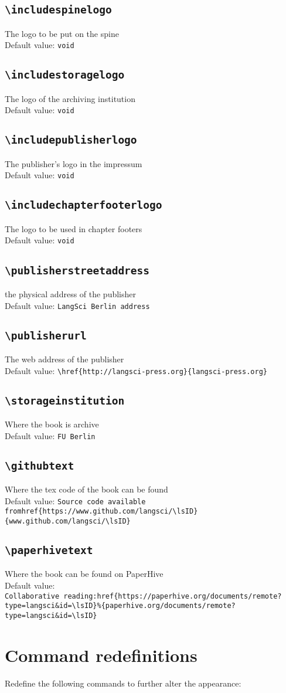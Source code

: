 \documentclass[%
output=guidelines,guidelines]{langscibook}
\newcommand{\option}[3]{\subsection{\texttt{#1}}{#2}\\Default value: {\texttt{#3}}}
\begin{document}
\option{{\textbackslash}includespinelogo}{The logo to be put on the spine}{void}
\option{{\textbackslash}includestoragelogo}{The logo of the archiving institution}{void}
\option{{\textbackslash}includepublisherlogo}{The publisher's logo in the impressum}{void}
\option{{\textbackslash}includechapterfooterlogo}{The logo to be used in chapter footers}{void}

\option{{\textbackslash}publisherstreetaddress}{the physical address of the publisher}{LangSci Berlin address}
\option{{\textbackslash}publisherurl}{The web address of the publisher}{\textbackslash href\{http://langsci-press.org\}\{langsci-press.org\}}
\option{{\textbackslash}storageinstitution}{Where the book is archive}{FU Berlin}
\option{{\textbackslash}githubtext}{Where the tex code of the book can be found}{Source code available from\newline {\textbackslash}href\{https://www.github.com/langsci/{\textbackslash}lsID\}\{www.github.com/langsci/{\textbackslash}lsID\}}
\option{{\textbackslash}paperhivetext}{Where the book can be found on PaperHive}{Collaborative~reading:\newline{\textbackslash}href\{https://paperhive.org/documents/remote?type=langsci\&id={\textbackslash}lsID\}\%\newline\{paperhive.org/documents/remote?type=langsci\&id={\textbackslash}lsID\}}


\section{Command redefinitions}
Redefine the following commands to further alter the appearance:
\end{document}
